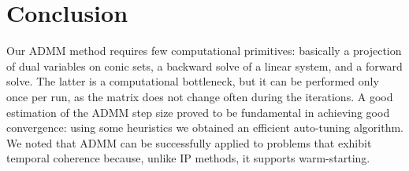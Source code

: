 \documentclass{svproc}
\begin{document}
\section{Conclusion}
 
Our ADMM method requires few computational primitives: basically a projection of dual variables on conic sets, a backward solve of a linear system, and a forward solve. The latter is a computational bottleneck, but it can be performed only once per run, as the matrix does not change often during the iterations. 
A good estimation of the ADMM step size proved to be fundamental in achieving good convergence: using some heuristics we obtained an efficient auto-tuning algorithm. 
We noted that ADMM can be successfully applied to problems that exhibit temporal coherence because, unlike IP methods, it supports warm-starting.







\end{document}

